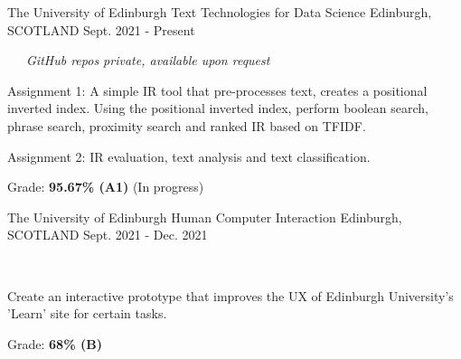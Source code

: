 \begin{cventries}
  \cventry
    {The University of Edinburgh} %
    {Text Technologies for Data Science} %
    {Edinburgh, SCOTLAND} %
    {Sept. 2021 - Present} %
    {
      \color{awesome}\color{graytext}\ \ \ \textit{GitHub repos private, available upon request}
      \vspace{1.8em}
      \begin{cvitems} %
        \item Assignment 1: A simple IR tool that pre-processes text, creates a positional inverted index. Using the positional inverted index, perform boolean search, phrase search, proximity search and ranked IR based on TFIDF.
        \item Assignment 2: IR evaluation, text analysis and text classification.
        \item Grade: \textbf{95.67\% (A1)} (In progress)
      \end{cvitems}
    }
    \vspace{.08cm}

  \cventry
    {The University of Edinburgh} %
    {Human Computer Interaction} %
    {Edinburgh, SCOTLAND} %
    {Sept. 2021 - Dec. 2021} %
    {
      \color{awesome}\color{graytext}\ \ \ \href{https://www.figma.com/proto/SEoaoC4LAWCmH1iGFA4AEO/G42-CW1?node-id=0\%3A1}{\faFigma\acvHeaderIconSep{}}\ \ \ \href{https://www.figma.com/proto/Q6wnTtZs5rP21QqnWcJBP6/G42-CW3?node-id=0\%3A1}{\faFigma\acvHeaderIconSep{}}
      \vspace{1.8em}
      \begin{cvitems} %
        \item Create an interactive prototype that improves the UX of Edinburgh University's 'Learn' site for certain tasks.
        \item Grade: \textbf{68\% (B)}
      \end{cvitems}
    }
    \vspace{.08cm}


\end{cventries}
